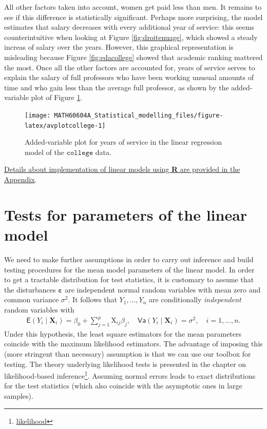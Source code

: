 \documentclass[
  11pt,
  letterpaper,
]{book}
\renewcommand{\href}[2]{#2\footnote{\url{#1}}}
\theoremstyle{definition}
\theoremstyle{definition}
\theoremstyle{definition}
\theoremstyle{definition}
\theoremstyle{remark}
\begin{document}
All other factors taken into account, women get paid less than men. It remains to see if this difference is statistically significant. Perhaps more surprising, the model estimates that salary decreases with every additional year of service: this seems counterintuitive when looking at Figure \ref{fig:droitenuage}, which showed a steady increas of salary over the years. However, this graphical representation is misleading because Figure \ref{fig:edacollege} showed that academic ranking mattered the most. Once all the other factors are accounted for, years of service serves to explain the salary of full professors who have been working unusual amounts of time and who gain less than the average full professor, as shown by the added-variable plot of Figure \ref{fig:avplotcollege}.

\begin{figure}

{\centering \texttt{[image: MATH60604A\_Statistical\_modelling\_files/figure-latex/avplotcollege-1]} 

}

\caption{Added-variable plot for years of service in the linear regression model of the  $\texttt{college}$ data.}\label{fig:avplotcollege}
\end{figure}

\protect\hyperlink{rlmfunc}{Details about implementation of linear models using \textbf{R} are provided in the Appendix}.

\hypertarget{test-lm}{%
\section{Tests for parameters of the linear model}\label{test-lm}}

We need to make further assumptions in order to carry out inference and build testing procedures for the mean model parameters of the linear model. In order to get a tractable distribution for test statistics, it is customary to assume that the disturbances \(\boldsymbol{\varepsilon}\) are independent normal random variables with mean zero and common variance \(\sigma^2\). It follows that \(Y_1, \ldots, Y_n\) are conditionally \emph{independent} random variables with
\begin{align*}
\mathsf{E}(Y_i \mid \mathbf{X}_i)=\beta_0 + \sum_{j=1}^p \mathrm{X}_{ij}\beta_j, \quad  \mathsf{Va}(Y_i\mid \mathbf{X}_i)= \sigma^2, \quad i=1, \ldots, n.
\end{align*}
Under this hypothesis, the least square estimators for the mean parameters coincide with the maximum likelihood estimators. The advantage of imposing this (more stringent than necessary) assumption is that we can use our toolbox for testing. The theory underlying likelihood tests is presented in the chapter on \href{likelihood}{likelihood-based inference}. Assuming normal errors leads to exact distributions for the test statistics (which also coincide with the asymptotic ones in large samples).
\end{document}
